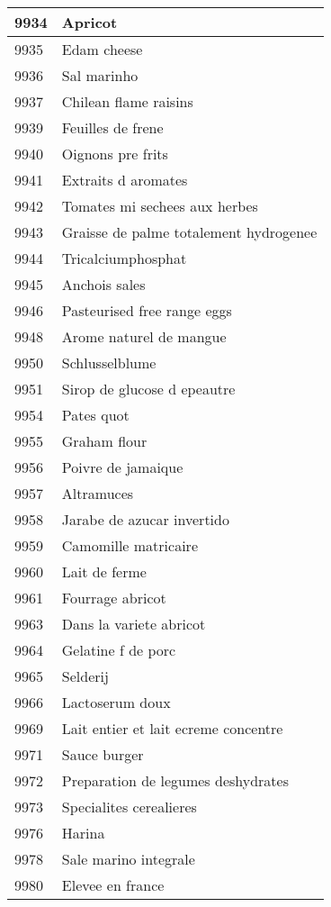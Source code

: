\begin{longtable}{|l|l|}
9934 & Apricot \\ \hline 
9935 & Edam cheese \\ \hline 
9936 & Sal marinho \\ \hline 
9937 & Chilean flame raisins \\ \hline 
9939 & Feuilles de frene \\ \hline 
9940 & Oignons pre frits \\ \hline 
9941 & Extraits d aromates \\ \hline 
9942 & Tomates mi sechees aux herbes \\ \hline 
9943 & Graisse de palme totalement hydrogenee \\ \hline 
9944 & Tricalciumphosphat \\ \hline 
9945 & Anchois sales \\ \hline 
9946 & Pasteurised free range eggs \\ \hline 
9948 & Arome naturel de mangue \\ \hline 
9950 & Schlusselblume \\ \hline 
9951 & Sirop de glucose d epeautre \\ \hline 
9954 & Pates quot \\ \hline 
9955 & Graham flour \\ \hline 
9956 & Poivre de jamaique \\ \hline 
9957 & Altramuces \\ \hline 
9958 & Jarabe de azucar invertido \\ \hline 
9959 & Camomille matricaire \\ \hline 
9960 & Lait de ferme \\ \hline 
9961 & Fourrage abricot \\ \hline 
9963 & Dans la variete abricot \\ \hline 
9964 & Gelatine f de porc \\ \hline 
9965 & Selderij \\ \hline 
9966 & Lactoserum doux \\ \hline 
9969 & Lait entier et lait ecreme concentre \\ \hline 
9971 & Sauce burger \\ \hline 
9972 & Preparation de legumes deshydrates \\ \hline 
9973 & Specialites cerealieres \\ \hline 
9976 & Harina \\ \hline 
9978 & Sale marino integrale \\ \hline 
9980 & Elevee en france \\ \hline 

\end{longtable}
